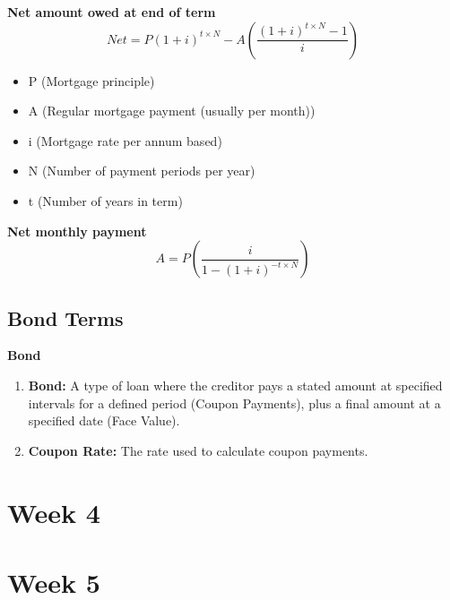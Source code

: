 \documentclass{article}
\begin{document}
    \begin{definition}
        \textbf{Net amount owed at end of term}
        \begin{equation}
            Net = P\left(1+i\right)^{t \times N} - A \left(\frac{\left(1+i\right)^{t \times N} - 1}{i}\right)
        \end{equation}
        \begin{itemize}
            \item P (Mortgage principle)
            \item A (Regular mortgage payment (usually per month))
            \item i (Mortgage rate per annum based)
            \item N (Number of payment periods per year)
            \item t (Number of years in term)
        \end{itemize}
    \end{definition}

    \begin{definition}
        \textbf{Net monthly payment}
        \begin{equation}
            A = P(\frac{i}{1 - (1+i)^{-t \times N}})
        \end{equation}
    \end{definition}

\subsection{Bond Terms}
    \begin{terminology}
        \textbf{Bond}
        \begin{enumerate}
            \item \textbf{Bond:} A type of loan where the creditor pays a stated amount at specified intervals for a defined period (Coupon Payments), plus a final amount at a specified date (Face Value).
            \item \textbf{Coupon Rate:} The rate used to calculate coupon payments.
        \end{enumerate}
    \end{terminology}


\section{Week 4}

\section{Week 5}
\end{document}
